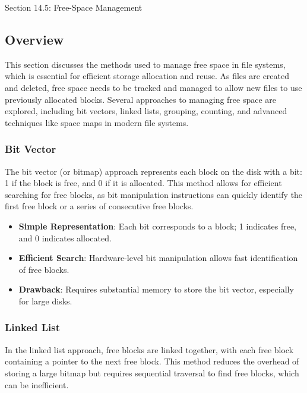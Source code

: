 \begin{notes}{Section 14.5: Free-Space Management}
    \subsection*{Overview}

    This section discusses the methods used to manage free space in file systems, which is essential for efficient storage allocation and reuse. As files are created and deleted, free space needs to be 
    tracked and managed to allow new files to use previously allocated blocks. Several approaches to managing free space are explored, including bit vectors, linked lists, grouping, counting, and advanced 
    techniques like space maps in modern file systems.
    
    \subsubsection*{Bit Vector}
    
    The bit vector (or bitmap) approach represents each block on the disk with a bit: 1 if the block is free, and 0 if it is allocated. This method allows for efficient searching for free blocks, as 
    bit manipulation instructions can quickly identify the first free block or a series of consecutive free blocks.
    
    \begin{highlight}
    
        \begin{itemize}
            \item \textbf{Simple Representation}: Each bit corresponds to a block; 1 indicates free, and 0 indicates allocated.
            \item \textbf{Efficient Search}: Hardware-level bit manipulation allows fast identification of free blocks.
            \item \textbf{Drawback}: Requires substantial memory to store the bit vector, especially for large disks.
        \end{itemize}
    
    \end{highlight}
    
    \subsubsection*{Linked List}
    
    In the linked list approach, free blocks are linked together, with each free block containing a pointer to the next free block. This method reduces the overhead of storing a large bitmap but requires 
    sequential traversal to find free blocks, which can be inefficient.
    

\end{notes}
